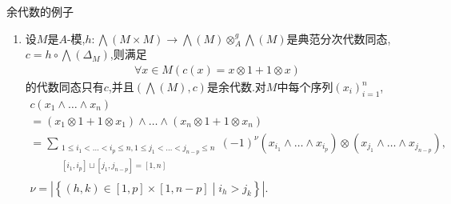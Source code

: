 \begin{example}{余代数的例子}{}
\begin{enumerate}
		\begin{align*}
			\forall x\in M\left(c\left(x\right)=1\otimes 1+1\otimes x\right)
		\end{align*}
		的$A$-代数同态,$\left(\mathsf{S}\left(M\right),c\right)$是$A$-余代数.固定$n\in\N$.对$M$中的每个序列$\left(x_{i}\right)_{i=1}^{n}$,
		\begin{align*}
			c\left(x_{1}\ldots x_{n}\right)
			=\prod\limits_{i=1}^{n}\left(x_{i}\otimes 1+1\otimes x_{i}\right)
			=\sum\limits_{\substack{1\leq i_{1}<\ldots<i_{p}\leq n,1\leq j_{1}<\ldots<j_{n-p}\leq n\\ \left[i_{1},i_{p}\right]\sqcup\left[j_{1},j_{n-p}\right]=\left[1,n\right]}}\left(x_{i_{1}}\ldots x_{i_{p}}\right)\otimes\left(x_{j_{1}}\otimes\ldots\otimes x_{j_{n-p}}\right),
		\end{align*}
		这是$\mathsf{S}\left(M\right)\otimes_{A}\mathsf{S}\left(M\right)$上全次数为$n$的元素,它的双次数为$\left(p,n-p\right)$($p\in\left[1,n-1\right]$)的齐次分量是
		\begin{align*}
			\sum\limits_{\sigma\in\Shuffle_{p,n-p}}\left(x_{\sigma\left(1\right)}\ldots x_{\sigma\left(p\right)}\right)\otimes\left(x_{\sigma\left(p+1\right)}\ldots x_{\sigma\left(n\right)}\right).
		\end{align*}
		\item 设$M$是$A$-模,$h:\bigwedge\left(M\times M\right)\to\bigwedge\left(M\right)\otimes_{A}^{g}\bigwedge\left(M\right)$是典范分次代数同态,$c=h\circ\bigwedge\left(\Delta_{M}\right)$,则满足
		\begin{align*}
			\forall x\in M\left(c\left(x\right)=x\otimes 1+1\otimes x\right)
		\end{align*}
		的代数同态只有$c$,并且$\left(\bigwedge\left(M\right),c\right)$是余代数.对$M$中每个序列$\left(x_{i}\right)_{i=1}^{n}$,
		\begin{gather*}
			c\left(x_{1}\wedge\ldots\wedge x_{n}\right)\\
			=\left(x_{1}\otimes 1+1\otimes x_{1}\right)\wedge\ldots\wedge\left(x_{n}\otimes 1+1\otimes x_{n}\right)\\
			=\sum\limits_{\substack{1\leq i_{1}<\ldots<i_{p}\leq n,1\leq j_{1}<\ldots<j_{n-p}\leq n\\ \left[i_{1},i_{p}\right]\sqcup\left[j_{1},j_{n-p}\right]=\left[1,n\right]}}\left(-1\right)^{\nu}\left(x_{i_{1}}\wedge\ldots\wedge x_{i_{p}}\right)\otimes\left(x_{j_{1}}\wedge\ldots\wedge x_{j_{n-p}}\right),\\
			\nu=\left|\left\{\left(h,k\right)\in\left[1,p\right]\times\left[1,n-p\right]\middle|i_{h}>j_{k}\right\}\right|.

\end{gather*}
\end{enumerate}
\end{example}
